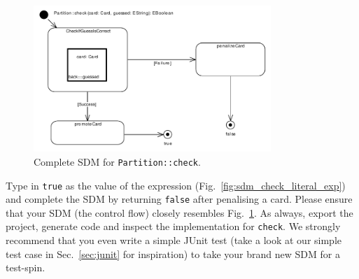 \begin{figure}[htbp]
\begin{center}
  \includegraphics[width=0.8\textwidth]{pics/sdmBilder/check/sdm40}
  \caption{Complete SDM for \texttt{Partition::check}.}
  \label{fig:sdm_check_finish}
\end{center}
\end{figure}

Type in \texttt{true} as the value of the expression
(Fig.~\ref{fig:sdm_check_literal_exp}) and complete the SDM by returning
\texttt{false} after penalising a card.  Please ensure that your SDM (the
control flow) closely resembles Fig.~\ref{fig:sdm_check_finish}.  As always,
export the project, generate code and inspect the implementation for
\texttt{check}.  We strongly recommend that you even write a simple JUnit test
(take a look at our simple test case in Sec.~\ref{sec:junit} for inspiration)
to take your brand new SDM for a test-spin.
